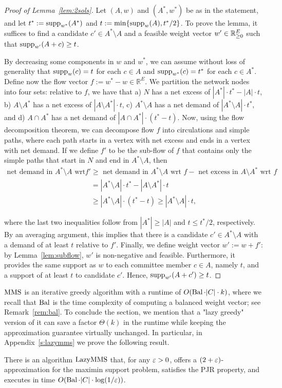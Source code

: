 \begin{proof}[Proof of Lemma~\ref{lem:2sols}]
Let $(A,w)$ and $(A^*, w^*)$ be as in the statement, and let $t^*:=\operatorname{supp}_{w^*}(A^*)$ and $t:=\min\{\operatorname{supp}_w(A), t^*/2\}$. To prove the lemma, it suffices to find a candidate $c'\in A^*\setminus A$ and a feasible weight vector $w'\in\mathbb{R}_{\geq 0}^E$ such that $\operatorname{supp}_{w'}(A+c)\geq t$.

By decreasing some components in $w$ and $w^*$, we can assume without loss of generality that $\operatorname{supp}_w(c)=t$ for each $c\in A$ and $\operatorname{supp}_{w^*}(c)=t^*$ for each $c\in A^*$. Define now the flow vector $f:=w^* - w\in\mathbb{R}^E$. 
We partition the network nodes into four sets: relative to $f$, we have that a) $N$ has a net excess of $|A^*|\cdot t^* - |A|\cdot t$, b) $A\setminus A^*$ has a net excess of $|A\setminus A^*|\cdot t$, c) $A^*\setminus A$ has a net demand of $|A^*\setminus A|\cdot t^*$, and d) $A\cap A^*$ has a net demand of $|A\cap A^*|\cdot (t^*-t)$.
Now, using the flow decomposition theorem, we can decompose flow $f$ into circulations and simple paths, where each path starts in a vertex with net excess and ends in a vertex with net demand. If we define $f'$ to be the sub-flow of $f$ that contains only the simple paths that start in $N$ and end in $A^*\setminus A$, then %
%
\begin{align*}
    \text{net demand in $A^*\setminus A$ wrt } f' &\geq \text{ net demand in $A^*\setminus A$ wrt } f - \text{ net excess in $A\setminus A^*$ wrt } f\\
    &= |A^*\setminus A|\cdot t^* - |A\setminus A^*|\cdot t\\
    &\geq |A^*\setminus A|\cdot (t^*-t) \geq |A^*\setminus A|\cdot t,
\end{align*}

where the last two inequalities follow from $|A^*|\geq |A|$ and $t\leq t^*/2$, respectively. By an averaging argument, this implies that there is a candidate $c'\in A^*\setminus A$ with a demand of at least $t$ relative to $f'$.
Finally, we define weight vector $w':=w+f'$: by Lemma~\ref{lem:subflow}, $w'$ is non-negative and feasible. 
Furthermore, it provides the same support as $w$ to each committee member $c\in A$, namely $t$, and a support of at least $t$ to candidate $c'$. Hence, $\operatorname{supp}_{w'}(A+c')\geq t$. 
\end{proof}

$\operatorname{MMS}$ is an iterative greedy algorithm with a runtime of $O(\operatorname{Bal} \cdot |C|\cdot k)$, where we recall that $\operatorname{Bal}$ is the time complexity of computing a balanced weight vector; see Remark~\ref{rem:bal}. 
To conclude the section, we mention that a "lazy greedy" version of it can save a factor $\Theta(k)$ in the runtime while keeping the approximation guarantee virtually unchanged. 
In particular, in Appendix~\ref{s:lazymms} we prove the following result.

\begin{theorem}\label{thm:2eps}
There is an algorithm $\operatorname{LazyMMS}$ that, for any $\varepsilon>0$, offers a $(2+\varepsilon)$-approximation for the maximin support problem, satisfies the PJR property, and executes in time $O(\operatorname{Bal}\cdot |C|\cdot \log(1/\varepsilon))$.
\end{theorem}

